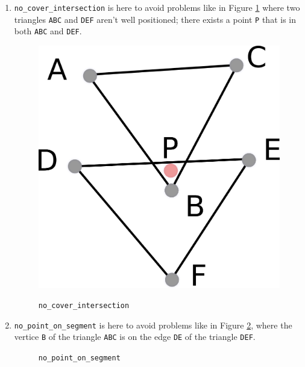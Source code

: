 \documentclass[a4paper,10pt]{article}
\begin{document}
\begin{enumerate}
\item {\tt no\_cover\_intersection} is here to avoid problems like in Figure \ref{nci} where two triangles {\tt ABC} and {\tt DEF} aren't well positioned; there exists a point {\tt P} that is in both {\tt ABC} and {\tt DEF}.
\\
\begin{figure}[h]
\centering
\caption{\label{nci} {\tt no\_cover\_intersection}}
\includegraphics[scale=2]{nci}\\
\end{figure}
\item {\tt no\_point\_on\_segment} is here to avoid problems like in Figure \ref{nps}, where the vertice {\tt B} of the triangle {\tt ABC} is on the edge {\tt DE} of the triangle {\tt DEF}.
\\
\begin{figure}[h]
\centering
\caption{\label{nps} {\tt no\_point\_on\_segment}}

\end{figure}
\end{enumerate}
\end{document}
